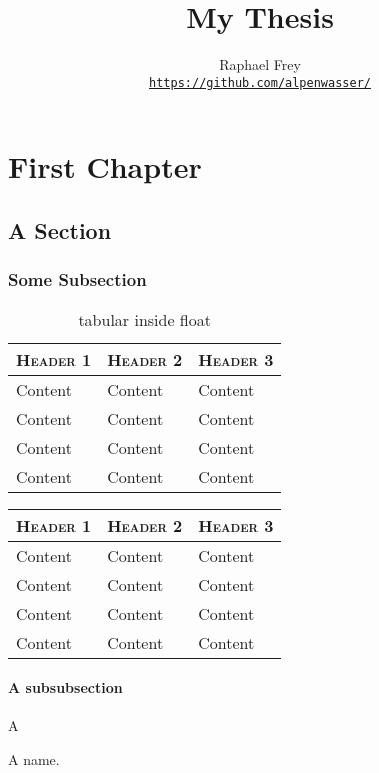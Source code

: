 \documentclass[a4paper,11pt,oneside,showtrims]{alpenthesis}
\title{My Thesis}
\author{Raphael Frey \\[1ex]\href{https://github.com/alpenwasser/}
                                 {\nolinkurl{https://github.com/alpenwasser/}}}
\begin{document}
\begin{titlingpage}
    \maketitle
\end{titlingpage}
\frontmatter
\tableofcontents*

\mainmatter
\chapter{First Chapter}

\lipsum[1]

\section{A Section}

\lipsum[2]

\subsection{Some Subsection}

\begin{table}
    \centering
    \caption{tabular inside float}
    \label{tab:float}
    \begin{tabular}{lll}
        \toprule
        \scshape Header 1 & \scshape Header 2 & \scshape Header 3 \\
        \midrule
        Content           & Content           & Content           \\
        Content           & Content           & Content           \\
        Content           & Content           & Content           \\
        Content           & Content           & Content           \\
        \bottomrule
    \end{tabular}
\end{table}

\lipsum[3]

\begin{center}
    \label{tab:outside}
    \begin{tabular}{lll}
        \toprule
        \scshape Header 1 & \scshape Header 2 & \scshape Header 3 \\
        \midrule
        Content           & Content           & Content           \\
        Content           & Content           & Content           \\
        Content           & Content           & Content           \\
        Content           & Content           & Content           \\
        \bottomrule
    \end{tabular}
\end{center}

\subsubsection{A subsubsection}

A 

A  name.

\end{document}
